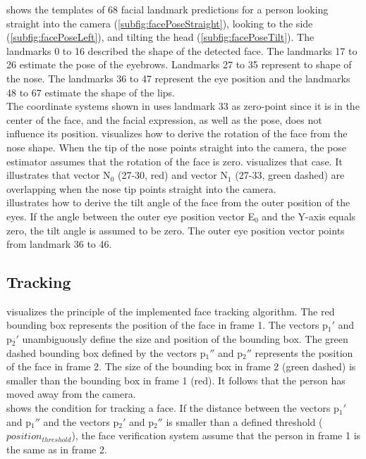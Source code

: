 \documentclass[%
a4paper,
twoside,
openany,
dvipsnames
]
{report}
\let\svfigure\figure
\let\svendfigure\endfigure
\renewenvironment{figure}[1][tb]{\svfigure[#1]\setstretch{1}}
{\svendfigure}
\begin{document}
 shows the templates of 68 facial landmark predictions for a person looking straight into the camera (\cref{subfig:facePoseStraight}), looking to the side (\cref{subfig:facePoseLeft}), and tilting the head (\cref{subfig:facePoseTilt}). The landmarks 0 to 16 described the shape of the detected face. The landmarks 17 to 26 estimate the pose of the eyebrows. Landmarks 27 to 35 represent to shape of the nose. The landmarks 36 to 47 represent the eye position and the landmarks 48 to 67 estimate the shape of the lips. \\
The coordinate systems shown in  uses landmark 33 as zero-point since it is in the center of the face, and the facial expression, as well as the pose, does not influence its position.
 visualizes how to derive the rotation of the face from the nose shape. When the tip of the nose points straight into the camera, the pose estimator assumes that the rotation of the face is zero.  visualizes that case. It illustrates that vector N$_0$ (27-30, red) and vector N$_1$ (27-33, green dashed) are overlapping when the nose tip points straight into the camera. \\
 illustrates how to derive the tilt angle of the face from the outer position of the eyes. If the angle between the outer eye position vector E$_0$ and the Y-axis equals zero, the tilt angle is assumed to be zero. The outer eye position vector points from landmark 36 to 46.

\subsection{Tracking}
\begin{figure}[h]
	\centering
	
	\caption[Face tracking using face bounding box]{Face tracking using the face bounding box. The size and position of the rectangle are defined by p$_1$ and p$_2$.}
	\label{fig:tracking}
\end{figure} 
 visualizes the principle of the implemented face tracking algorithm. The red bounding box represents the position of the face in frame 1. The vectors p$_1'$ and p$_2'$ unambiguously define the size and position of the bounding box. The green dashed bounding box defined by the vectors p$_1''$ and p$_2''$ represents the position of the face in frame 2. The size of the bounding box in frame 2 (green dashed) is smaller than the bounding box in frame 1 (red). It follows that the person has moved away from the camera. \\
 shows the condition for tracking a face. If the distance between the vectors p$_1'$ and p$_1''$ and the vectors p$_2'$ and p$_2''$ is smaller than a defined threshold ($position_{threshold}$), the face verification system assume that the person in frame 1 is the same as in frame 2. 
\end{document}
